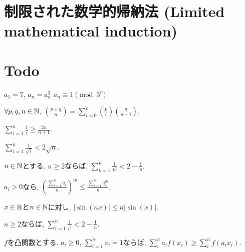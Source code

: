 \section{制限された数学的帰納法 (Limited mathematical induction)}

\section{Todo}






\begin{prop}
  $a_1=7$, $a_{n}=a_{n}^3$
  $a_n\equiv 1\pmod{3^n}$
\end{prop}


\begin{prop}
  $\forall p,q,n\in\mathbb{N}$,
  $\binom{p+q}{n}=\sum_{i=0}^n\binom{p}{i}\binom{q}{n-i}$.
\end{prop}



\begin{prop}
$\sum_{i=1}^{n}\frac{1}{i}\geq \frac{2n}{n+1}$.
\end{prop}


\begin{prop}
$\sum_{i=1}^{n}\frac{1}{\sqrt{i}}<2\sqrt{n}$.
\end{prop}

\begin{prop}
$n\in\mathbb{N}$とする.
  $n\geq 2$ならば, $\sum_{k=1}^n\frac{1}{k^2} < 2-\frac{1}{n}$.
\end{prop}



\begin{prop}
  $a_i>0$なら,
  $\left(\frac{\sum_{i=1}^n a_i}{n}\right)^m \leq \frac{\sum_{i=1}^{n}a_i^m}{n}$.
\end{prop}

\begin{prop}
$x\in\mathbb{R}$と$n\in\mathbb{N}$に対し, $|\sin(nx)|\leq n|\sin(x)|$.
\end{prop}

\begin{prop}
  $n\geq 2$ならば,
  $\sum_{i=1}^{n}\frac{1}{i^2}<2-\frac{1}{n}$.
\end{prop}

\begin{prop}
  $f$を凸関数とする.
  $a_i\geq 0$, $\sum_{i=1}^n a_i=1$ならば,
  $\sum_{i}^{n} a_i f(x_i)\geq \sum_{i}^{n}  f(a_i x_i)$.
\end{prop}




